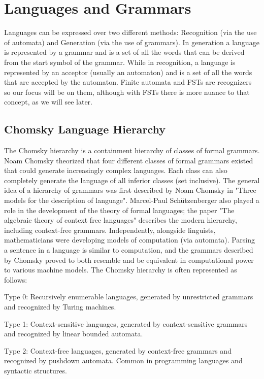 \section{Languages and Grammars}

Languages can be expressed over two different methods:
Recognition (via the use of automata) and Generation (via the use of grammars). 
In generation a language is represented by a grammar and is a set of all the words that can be derived from the start symbol of the grammar. 
While in recognition, a language is represented by an acceptor (usually an automaton) and is a set of all the words that are accepted by the automaton.
Finite automata and FSTs are recognizers so our focus will be on them, although with FSTs there is more nuance to that concept, as we will see later.

\subsection{Chomsky Language Hierarchy}

The Chomsky hierarchy\cite{chomsky_hierarchy} is a containment hierarchy of classes of formal grammars. 
Noam Chomsky theorized that four different classes of formal grammars existed that could generate increasingly complex languages. 
Each class can also completely generate the language of all inferior classes (set inclusive).
The general idea of a hierarchy of grammars was first described by Noam Chomsky in "Three models for the description of language".
Marcel-Paul Schützenberger also played a role in the development of the theory of formal languages; 
the paper "The algebraic theory of context free languages" describes the modern hierarchy, including context-free grammars.
Independently, alongside linguists, mathematicians were developing models of computation (via automata). 
Parsing a sentence in a language is similar to computation, 
and the grammars described by Chomsky proved to both resemble and be equivalent in computational power to various machine models.
The Chomsky hierarchy is often represented as follows:

    Type 0: Recursively enumerable languages, generated by unrestricted grammars and recognized by Turing machines.

    Type 1: Context-sensitive languages, generated by context-sensitive grammars and recognized by linear bounded automata.

    Type 2: Context-free languages, generated by context-free grammars and recognized by pushdown automata. Common in programming languages and syntactic structures.

